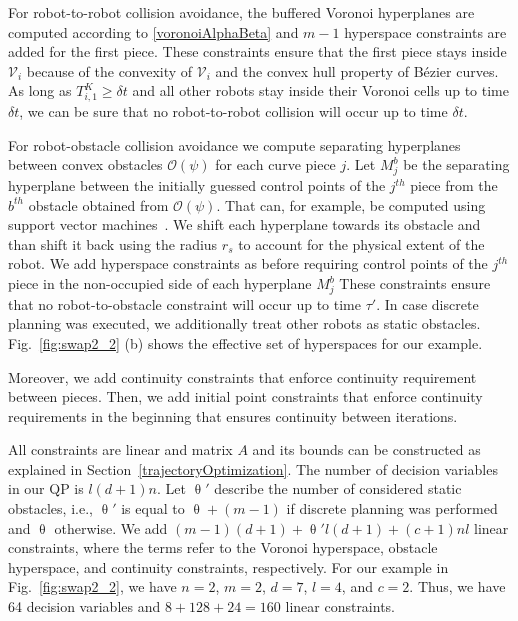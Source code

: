 \documentclass{svproc}
\newcommand{\vP}{\mathbf{P}}
\newcommand{\cV}{\mathcal{V}}
\newcommand{\cO}{\mathcal{O}}
\begin{document}
For robot-to-robot collision avoidance, the buffered Voronoi hyperplanes are computed according to \eqref{voronoiAlphaBeta} and $m-1$ hyperspace constraints are added for the first piece.
These constraints ensure that the first piece stays inside $\cV_i$ because of the convexity of $\cV_i$ and the convex hull property of B\'ezier curves.
As long as $T^{K}_{i,1} \geq \delta t$ and all other robots stay inside their Voronoi cells up to time $\delta t$, we can be sure that no robot-to-robot collision will occur up to time $\delta t$.

For robot-obstacle collision avoidance we compute separating hyperplanes between convex obstacles $\cO(\psi)$ for each curve piece $j$.
Let $M_j^b$ be the separating hyperplane between the initially guessed control points of the $j^{th}$ piece from the $b^{th}$ obstacle obtained from $\cO(\psi)$. That can, for example, be computed using support vector machines~\cite{SVM}.
We shift each hyperplane towards its obstacle and than shift it back using the radius $r_s$ to account for the physical extent of the robot.
We add hyperspace constraints as before requiring control points of the $j^{th}$ piece in the non-occupied side of each hyperplane $M_j^b$
These constraints ensure that no robot-to-obstacle constraint will occur up to time $\tau'$.
In case discrete planning was executed, we additionally treat other robots as static obstacles.
Fig.~\ref{fig:swap2_2} (b) shows the effective set of hyperspaces for our example.

Moreover, we add continuity constraints that enforce continuity requirement between pieces. Then, we add initial point constraints that enforce continuity requirements in the beginning that ensures continuity between iterations.

All constraints are linear and matrix $A$ and its bounds can be constructed as explained in Section~\ref{trajectoryOptimization}.
The number of decision variables in our QP is $l(d+1)n$.
Let $\uptheta'$ describe the number of considered static obstacles, i.e., $\uptheta'$ is equal to $\uptheta + (m-1)$ if discrete planning was performed and $\uptheta$ otherwise.
We add $(m-1)(d+1) + \uptheta' l(d+1) + (c+1)nl$ linear constraints, where the terms refer to the Voronoi hyperspace, obstacle hyperspace, and continuity constraints, respectively.
For our example in Fig.~\ref{fig:swap2_2}, we have $n=2$, $m=2$, $d=7$, $l=4$, and $c=2$. Thus, we have 64 decision variables and $8 + 128 + 24 = 160$ linear constraints.
\end{document}
